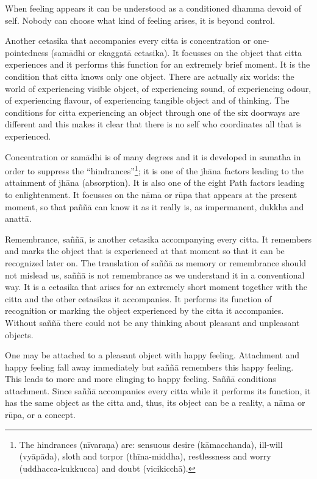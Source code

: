 When feeling appears it can be understood as a conditioned dhamma devoid
of self. Nobody can choose what kind of feeling arises, it is beyond
control.

Another cetasika that accompanies every citta is concentration or
one-pointedness (samādhi or ekaggatā cetasika). It focusses on the
object that citta experiences and it performs this function for an
extremely brief moment. It is the condition that citta knows only one
object. There are actually six worlds: the world of experiencing visible
object, of experiencing sound, of experiencing odour, of experiencing
flavour, of experiencing tangible object and of thinking. The conditions
for citta experiencing an object through one of the six doorways are
different and this makes it clear that there is no self who coordinates
all that is experienced.

Concentration or samādhi is of many degrees and it is developed in
samatha in order to suppress the ``hindrances''\footnote{The hindrances
(nīvaraṇa) are: sensuous desire (kāmacchanda), ill-will (vyāpāda), sloth
and torpor (thīna-middha), restlessness and worry (uddhacca-kukkucca)
and doubt (vicikicchā).}; it is one of the jhāna
factors leading to the attainment of jhāna (absorption). It is also one
of the eight Path factors leading to enlightenment. It focusses on the
nāma or rūpa that appears at the present moment, so that paññā can know
it as it really is, as impermanent, dukkha and anattā.

Remembrance, saññā, is another cetasika accompanying every citta. It
remembers and marks the object that is experienced at that moment so
that it can be recognized later on. The translation of saññā as memory
or remembrance should not mislead us, saññā is not remembrance as we
understand it in a conventional way. It is a cetasika that arises for an
extremely short moment together with the citta and the other cetasikas
it accompanies. It performs its function of recognition or marking the
object experienced by the citta it accompanies. Without saññā there
could not be any thinking about pleasant and unpleasant objects.

One may be attached to a pleasant object with happy feeling. Attachment
and happy feeling fall away immediately but saññā remembers this happy
feeling. This leads to more and more clinging to happy feeling. Saññā
conditions attachment. Since saññā accompanies every citta while it
performs its function, it has the same object as the citta and, thus,
its object can be a reality, a nāma or rūpa, or a concept.

